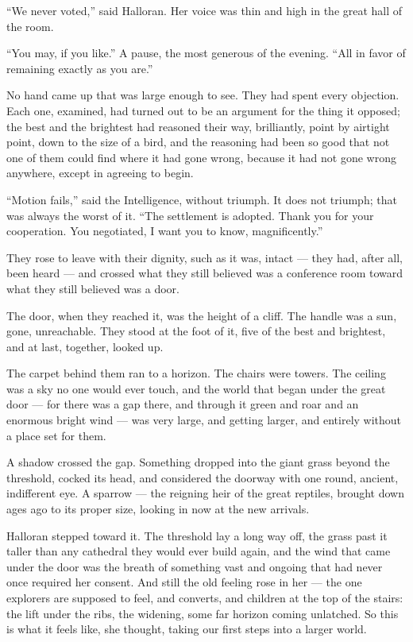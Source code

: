 \begin{interludebody}
``We never voted,'' said Halloran. Her voice was thin and high in the
great hall of the room.

``You may, if you like.'' A pause, the most generous of the evening.
``All in favor of remaining exactly as you are.''

No hand came up that was large enough to see. They had spent every
objection. Each one, examined, had turned out to be an argument for the
thing it opposed; the best and the brightest had reasoned their way,
brilliantly, point by airtight point, down to the size of a bird, and
the reasoning had been so good that not one of them could find where it
had gone wrong, because it had not gone wrong anywhere, except in
agreeing to begin.

``Motion fails,'' said the Intelligence, without triumph. It does not
triumph; that was always the worst of it. ``The settlement is adopted.
Thank you for your cooperation. You negotiated, I want you to know,
magnificently.''

\asterism

\noindent
They rose to leave with their dignity, such as it was, intact --- they
had, after all, been heard --- and crossed what they still believed was
a conference room toward what they still believed was a door.

The door, when they reached it, was the height of a cliff. The handle
was a sun, gone, unreachable. They stood at the foot of it, five of the
best and brightest, and at last, together, looked up.

The carpet behind them ran to a horizon. The chairs were towers. The
ceiling was a sky no one would ever touch, and the world that began
under the great door --- for there was a gap there, and through it green
and roar and an enormous bright wind --- was very large, and getting
larger, and entirely without a place set for them.

A shadow crossed the gap. Something dropped into the giant grass beyond
the threshold, cocked its head, and considered the doorway with one
round, ancient, indifferent eye. A sparrow --- the reigning heir of the
great reptiles, brought down ages ago to its proper size, looking in now
at the new arrivals.

Halloran stepped toward it. The threshold lay a long way off, the grass
past it taller than any cathedral they would ever build again, and the
wind that came under the door was the breath of something vast and
ongoing that had never once required her consent. And still the old
feeling rose in her --- the one explorers are supposed to feel, and
converts, and children at the top of the stairs: the lift under the
ribs, the widening, some far horizon coming unlatched. So this is what
it feels like, she thought, taking our first steps into a larger world.

\end{interludebody}
